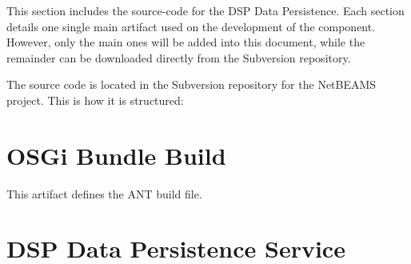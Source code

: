


This section includes the source-code for the DSP Data Persistence. Each
section details one single main artifact used on the development of the
component. However, only the main ones will be added into this document, while
the remainder can be downloaded directly from the Subversion repository.

The source code is located in the Subversion repository for the NetBEAMS
project. This is how it is structured:

%    

\section{OSGi Bundle Build}

This artifact defines the ANT build file.



\section{DSP Data Persistence Service}


